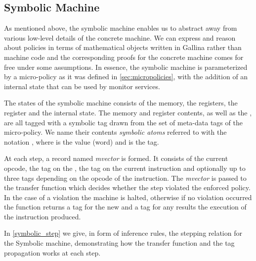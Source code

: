 \subsection{Symbolic Machine}\label{sec:symbolic}

As mentioned above, the symbolic machine enables us to abstract away from
various low-level details of the concrete machine. We can express and reason
about policies in terms of mathematical objects written in Gallina rather than
machine code and the corresponding proofs for the concrete machine comes for
free under some assumptions.
In essence, the symbolic machine is parameterized by a micro-policy as it was
defined in \ref{sec:micropolicies}, with the addition of an internal state
that can be used by monitor services.

The states of the symbolic machine consists of the memory, the
registers, the \pc register and the internal state. The memory and
register contents, as well as the \pc, are all tagged with a symbolic
tag drawn from the set of meta-data tags of the micro-policy. We name
their contents \textit{symbolic atoms} referred to with the notation
, where  is the value (word) and  is
the tag.

At each step, a record named \emph{mvector} is formed. It consists of
the current opcode, the tag on the \pc, the tag on the current
instruction and optionally up to three tags depending on the opcode of
the instruction. The \emph{mvector} is passed to the transfer function
which decides whether the step violated the enforced policy. In the
case of a violation the machine is halted, otherwise if no violation
occurred the \TRANSFER function returns a tag for the new \pc and a
tag for any results the execution of the instruction produced.

In \cref{symbolic_step} we give, in form of inference rules, the
stepping relation for the Symbolic machine, demonstrating how the
transfer function and the tag propagation works at each step.

